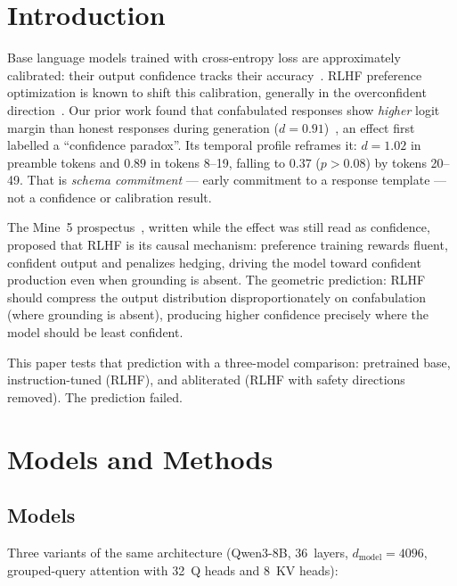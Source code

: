 \documentclass[11pt,a4paper]{article}
\begin{document}
\section{Introduction}
\label{sec:intro}

Base language models trained with cross-entropy loss are approximately
calibrated: their output confidence tracks their accuracy~\citep{kadavath2022language}.
RLHF preference optimization is known to shift this calibration,
generally in the overconfident direction~\citep{openai2023gpt4}.
Our prior work found that confabulated responses show \emph{higher}
logit margin than honest responses during generation
($d{=}0.91$)~\citep{lyra2026decision}, an effect first labelled a
``confidence paradox''. Its temporal profile reframes it: $d{=}1.02$
in preamble tokens and $0.89$ in tokens 8--19, falling to $0.37$
($p{>}0.08$) by tokens 20--49. That is \emph{schema commitment} ---
early commitment to a response template --- not a confidence or
calibration result.

The Mine~5 prospectus~\citep{lyra2026mine5}, written while the effect
was still read as confidence, proposed that RLHF is its causal
mechanism: preference training rewards fluent, confident
output and penalizes hedging, driving the model toward confident
production even when grounding is absent. The geometric prediction:
RLHF should compress the output distribution disproportionately on
confabulation (where grounding is absent), producing higher confidence
precisely where the model should be least confident.

This paper tests that prediction with a three-model comparison:
pretrained base, instruction-tuned (RLHF), and abliterated
(RLHF with safety directions removed). The prediction failed.

\section{Models and Methods}
\label{sec:methods}

\subsection{Models}

Three variants of the same architecture (Qwen3-8B, 36~layers,
$d_\text{model}{=}4096$, grouped-query attention with 32~Q heads and
8~KV heads):
\end{document}
